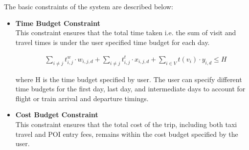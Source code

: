The basic constraints of the system are described below:

\begin{itemize}

\item \textbf{Time Budget Constraint}\\
This constraint ensures that the total time taken i.e. the sum of visit and travel times is under the user specified time budget for each day.

\begin{align}
\label{mul_day_9}
    & \sum_{i \ne j} t^{w}_{i,j} \cdot w_{i,j,d}
    + \sum_{i \ne j} t^{t}_{i,j} \cdot x_{i,j,d}
    + \sum_{i \in V} t(v_i) \cdot y_{i,d} \leq H
\end{align}

where H is the time budget specified by user. The user can specify different time budgets for the first day, last day, and intermediate days to account for flight or train arrival and departure timings.
\\[1ex]
\item \textbf{Cost Budget Constraint} \\
 This constraint ensures that the total cost of the trip, including both taxi travel and POI entry fees, remains within the cost budget specified by the user.


\end{itemize}
